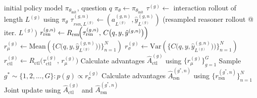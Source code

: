 \begin{algorithm}
    \caption{Hierarchical Policy Optimization}
    \label{alg:ouralgopsuedocode}
    \small
    \begin{algorithmic}
        \REQUIRE initial policy model $\pi_{\theta_\text{init}}$, question $q$
        \STATE $\pi_{\theta} \gets \pi_{\theta_\text{init}}$
            \STATE $\tau^{(g)} \gets$ interaction rollout of length $L^{(g)}$ using $\pi_{\theta}$
                \STATE $\tau_{rsn, L^{(g)}}^{(g, n)} \gets (a_{L^{(g)}}^{(g,n)},\hat{y}_{L^{(g)}}^{(g,n)}) $ (resampled reasoner rollout @ iter. $L^{(g)}$)
                \STATE $ r_{\text{rsn}}^{(g,n)} \gets R_{\text{rsn}}\!\Bigl(\tau_{\text{rsn}}^{(g,n)},\, C\bigl(q,y,\hat{y}^{(g,n)}\bigr)\Bigr)$
            \ENDFOR
            \STATE $r_\mu^{(g)} \gets \text{Mean}(\{C\bigl(q,y,\hat{y}_{L^{(g)}}^{(g,n)}\bigr)\Bigr)\}_{n=1}^N)$
            \STATE $r_\sigma^{(g)} \gets \text{Var}(\{C\bigl(q,y,\hat{y}_{L^{(g)}}^{(g,n)}\bigr)\Bigr)\}_{n=1}^N)$
            \STATE $r_\text{ctl}^{(g)} \gets R_{\text{ctl}}\!\bigl(\tau_{\text{ctl}}^{(g)},\, r_\mu^{(g)}\bigr)$
        \ENDFOR
        \STATE Calculate advantages $\hat{A}_{\text{ctl}}^{(g)}$ using $\{r_\mu^{(g)}\}_{g=1}^G$
        \STATE Sample $g^* \sim \{1, 2, ..., G\}: p(g) \propto r_\sigma^{(g)}$
        \STATE Calculate advantages $\hat{A}_{\text{rsn}}^{(g^*,n)}$ using $\{r_{\text{rsn}}^{(g^*,n)}\}_{n=1}^N$
        \STATE Joint update using $\hat{A}_{\text{ctl}}^{(g)}$ and $\hat{A}_{\text{rsn}}^{(g^*,n)}$
    \end{algorithmic}
\end{algorithm}

